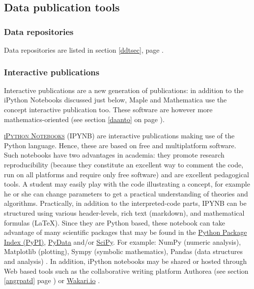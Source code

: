 \subsection{Data publication tools}

\subsubsection{Data repositories}

Data repositories are listed in section \ref{ddtsec}, page \pageref{ddtsec}.

\subsubsection{Interactive publications}

Interactive publications are a new generation of publications: in addition to the iPython Notebooks  discussed just below, Maple and Mathematica use the concept interactive publication too. These software are however more mathematics-oriented (see section \ref{daanto} on page \pageref{daanto}).

\vspace{0.4cm}

 \textsc{\href{http://ipython.org/notebook.html}{iPython Notebooks}} (IPYNB) are interactive publications making use of the Python language. Hence, these are based on free and multiplatform software. Such notebooks have two advantages in academia: they promote research reproducibility (because they constitute an excellent way to comment the code, run on all platforms and require only free software) and are excellent pedagogical tools. A student may easily play with the code illustrating a concept, for example he or she can change parameters to get a practical understanding of theories and algorithms. Practically, in addition to the interpreted-code parts, IPYNB can be structured using various header-levels, rich text (markdown), and mathematical formulas (\LaTeX). Since they are Python based, these notebook can take advantage of many scientific packages that may be found in the \href{https://pypi.python.org/pypi}{Python Package Index (PyPI)}, \href{http://pydata.org/downloads/}{PyData} and/or \href{http://www.scipy.org/}{SciPy}. For example: NumPy (numeric analysis), Matplotlib (plotting), Sympy (symbolic mathematics), Pandas (data structures and analysis) \cite{numpy_numpy_2015,python_software_foundation_python.org_2015}. In addition, iPython notebooks may be shared or hosted through Web based tools such as the collaborative writing platform Authorea (see section \ref{angrpatd} page \pageref{angrpatd}) or \href{https://wakari.io/}{Wakari.io} \cite{wikipedia_ipython_2015,ipython.org_ipython_2015}.

